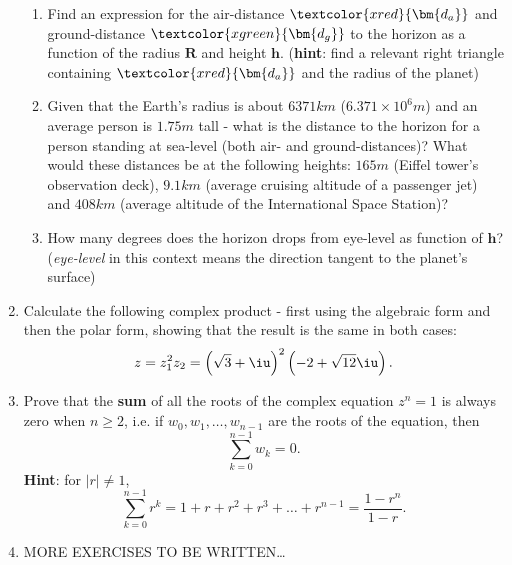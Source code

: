 \begin{enumerate}
		\begin{enumerate}[label=(\roman*)]
			\item Find an expression for the air-distance $\textcolor{xred}{\bm{d_{a}}}$ and ground-distance $\textcolor{xgreen}{\bm{d_{g}}}$ to the horizon as a function of the radius $\bm{R}$ and height $\bm{h}$. (\textbf{hint}: find a relevant right triangle containing $\textcolor{xred}{\bm{d_{a}}}$ and the radius of the planet)
			\item Given that the Earth's radius is about $6371\si{km}$ ($6.371\times10^{6}\si{m}$) and an average person is $1.75\si{m}$ tall - what is the distance to the horizon for a person standing at sea-level (both air- and ground-distances)? What would these distances be at the following heights: $165\si{m}$ (Eiffel tower's observation deck), $9.1\si{km}$ (average cruising altitude of a passenger jet) and $408\si{km}$ (average altitude of the International Space Station)?
			\item How many degrees does the horizon drops from eye-level as function of $\bm{h}$? (\textit{eye-level} in this context means the direction tangent to the planet's surface)
		\end{enumerate}

	\item Calculate the following complex product - first using the algebraic form and then the polar form, showing that the result is the same in both cases:
		\[
			z = z_{1}^{2}z_{2} = \left( \sqrt{3}+\iu \right)^{2} \left( -2+\sqrt{12}\iu \right).
		\]

	\item Prove that the \textbf{sum} of all the roots of the complex equation $z^{n}=1$ is always zero when $n\geq2$, i.e. if $w_{0},w_{1},\dots,w_{n-1}$ are the roots of the equation, then
		\[
			\sum\limits_{k=0}^{n-1}w_{k} = 0.
		\]
		\textbf{Hint}: for $|r|\neq1$,
		\[
			\sum\limits_{k=0}^{n-1}r^{k} = 1 + r + r^{2} + r^{3} + \dots + r^{n-1} = \frac{1-r^{n}}{1-r}.
		\]

	\item MORE EXERCISES TO BE WRITTEN\ldots
\end{enumerate}

